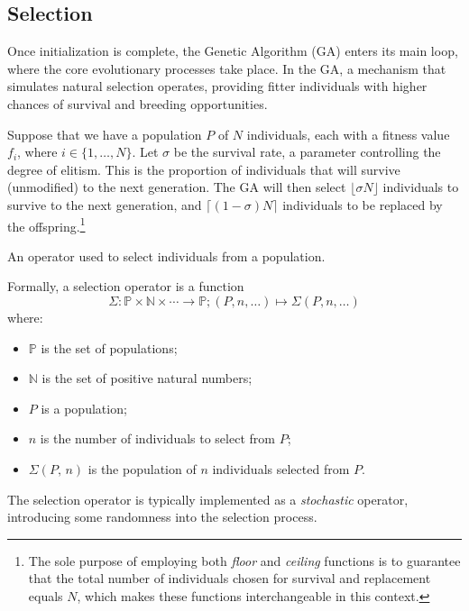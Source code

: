 \subsection{Selection}
\label{sec:genetic_algorithms:selection}
  Once initialization is complete, the Genetic Algorithm (GA) enters its main loop, where the core 
  evolutionary processes take place.
  In the GA, a mechanism that simulates natural selection operates, providing fitter individuals 
  with higher chances of survival and breeding opportunities.

  Suppose that we have a population \(P\) of \(N\) individuals, each with a fitness value \(f_i\), 
  where \(i \in \{1, \ldots, N\}\).
  Let \(\sigma\) be the survival rate, a parameter controlling the degree of elitism.
  This is the proportion of individuals that will survive (unmodified) to the next generation.
  The GA will then select \(\lfloor\sigma N\rfloor\) individuals to survive to the next generation,
  and \(\lceil(1 - \sigma)N\rceil\) individuals to be replaced by the offspring.\footnote{
    The sole purpose of employing both \textit{floor} and \textit{ceiling} functions is to guarantee
    that the total number of individuals chosen for survival and replacement equals \(N\), which
    makes these functions interchangeable in this context.
  }

  \begin{definition}
    \label{def:selection_operator}
      An operator used to select individuals from a population.

      Formally, a selection operator is a function 
      \[
        \Sigma : \mathbb{P} \times \mathbb{N} \times \cdots \to \mathbb{P};
        (P, n, \dots) \mapsto \Sigma(P, n, \dots)
      \]
      where: 
      
      \begin{itemize}
        \item \(\mathbb{P}\) is the set of populations;
        \item \(\mathbb{N}\) is the set of positive natural numbers;
        \item \(P\) is a population;
        \item \(n\) is the number of individuals to select from \(P\);
        \item \(\Sigma(P,\, n)\) is the population of \(n\) individuals selected from \(P\).
      \end{itemize}
  \end{definition}

  The selection operator is typically implemented as a \emph{stochastic} operator, introducing some 
  randomness into the selection process.

